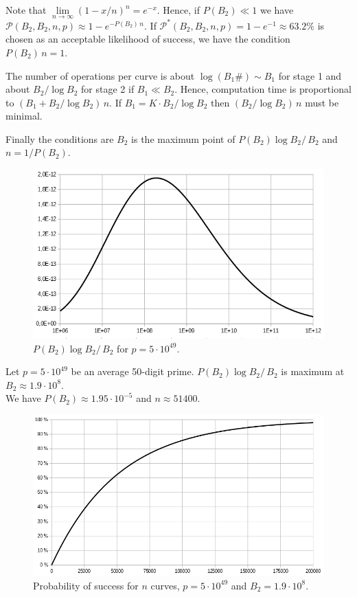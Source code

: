 \documentclass[a4paper, 11pt, pdftex]{report}
\theoremstyle{plain}
\theoremstyle{definition}
\begin{document}
Note that $\lim\limits_{n \to \infty} \left(1 - x/n \right)^n = e^{-x}$. Hence, if
$P(B_2) \ll 1$ we have $\mathcal{P}(B_2, B_2, n, p) \approx 1 - e^{-P(B_2)\, n}$.
If $\mathcal{P}^*(B_2, B_2, n, p) = 1 - e^{-1} \approx 63.2\%$ is chosen as an acceptable
likelihood of success, we have the condition $P(B_2)\, n = 1.$

The number of operations per curve is about $\log(B_1\#) \sim B_1$ for stage 1 and about
$B_2 / \log B_2$ for stage 2 if $B_1 \ll B_2$. Hence, computation time is proportional to
$\left(B_1 + B_2 / \log B_2 \right)\, n$. If $B_1 = K \cdot B_2 / \log B_2$ then
$\left(B_2 / \log B_2 \right)\, n$ must be minimal.

Finally the conditions are $B_2$ is the maximum point of $P(B_2) \log B_2 /\, B_2$
and $n = 1 / P(B_2)$.

\begin{figure}[!h]
	\centering
	\includegraphics[width=15.5cm, angle=0]{img/cond_max.png}
	\caption{\label{fig:max} $P(B_2) \log B_2 /\, B_2$ for $p = 5\cdot10^{49}$.}
\end{figure}

Let $p = 5\cdot10^{49}$ be an average 50-digit prime.
$P(B_2) \log B_2 /\, B_2$ is maximum at $B_2 \approx 1.9\cdot 10^8$.\\
We have $P(B_2) \approx 1.95\cdot 10^{-5}$ and $n \approx 51400$.

\begin{figure}[!ht]
	\centering
	\includegraphics[width=15.5cm, angle=0]{img/n_curves.png}
	\caption{\label{fig:p_n} Probability of success for $n$ curves, $p = 5\cdot10^{49}$ and $B_2 = 1.9\cdot 10^8$.}
\end{figure}
\end{document}
